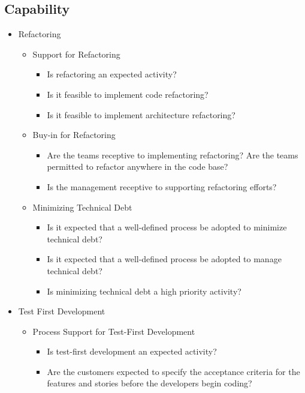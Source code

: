 \begin{appendices}
\section{Capability}

\begin{itemize}
	\item Refactoring
		\begin{itemize}
			\item Support for Refactoring 
				\begin{itemize}
					\item Is refactoring an expected activity?
					\item Is it feasible to implement code refactoring?
					\item Is it feasible to implement architecture refactoring?
				\end{itemize}
			\item Buy-in for Refactoring
				\begin{itemize}
					\item Are the teams receptive to implementing refactoring?
					\addition Are the teams permitted to refactor anywhere in the code base?
					\item Is the management receptive to supporting refactoring efforts?
				\end{itemize}
			\item Minimizing Technical Debt
				\begin{itemize}
					\item Is it expected that a well-defined process be adopted to minimize technical debt?
					\item Is it expected that a well-defined process be adopted to manage technical debt?
					\item Is minimizing technical debt a high priority activity?
				\end{itemize}
		\end{itemize}	
	\item Test First Development
		\begin{itemize}
			\item Process Support for Test-First Development
				\begin{itemize}
					\item Is test-first development an expected activity?
					\item Are the customers expected to specify the acceptance criteria for the features and stories before the developers begin coding?

\end{itemize}
\end{itemize}
\end{itemize}
\end{appendices}
